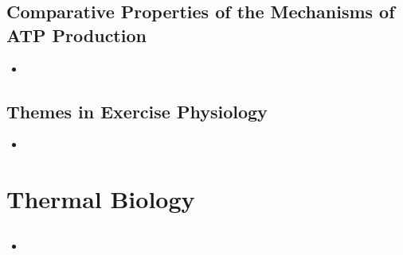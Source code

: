 \documentclass[12pt,a4paper]{article}
\begin{document}
\subsection{Comparative Properties of the Mechanisms of ATP Production}
\begin{itemize}
    \item 
\end{itemize}

\subsection{Themes in Exercise Physiology}
\begin{itemize}
    \item 
\end{itemize}

\clearpage
{}
\section{Thermal Biology}
\subsection{}
\begin{itemize}
    \item 
\end{itemize}
\end{document}
